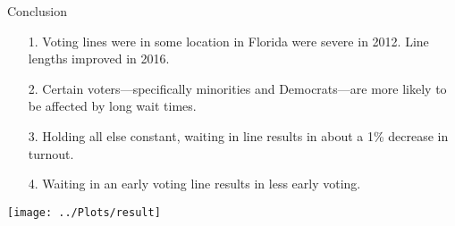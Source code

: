 \documentclass{beamer}
\begin{document}
		\begin{frame}
			Conclusion
			\begin{itemize}
				\item[1.] Voting lines were in some location in Florida were severe in 2012.  Line lengths improved in 2016.
				\item[2.] Certain voters---specifically minorities and Democrats---are more likely to be affected by long wait times. 
				\item[3.] Holding all else constant,
                                  waiting in line results in about a
                                  1\% decrease in turnout.
				\item[4.] Waiting in an early voting line
                                  results in less early voting.
			\end{itemize}
		\end{frame}
		
		\begin{frame}
		\centering
			\texttt{[image: ../Plots/result]}
		\end{frame}
		
			
\end{document}
